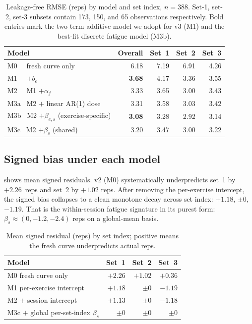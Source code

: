 \documentclass[11pt]{article}
\begin{document}
\begin{table}[ht]
\centering
\caption{Leakage-free RMSE (reps) by model and set index, $n=388$.
Set-1, set-2, set-3 subsets contain 173, 150, and 65 observations respectively.
Bold entries mark the two-term additive model we adopt for v3 (M1) and the best-fit discrete fatigue model (M3b).}
\label{tab:rmse}
\begin{tabular}{lrrrr}
\toprule
\textbf{Model} & \textbf{Overall} & \textbf{Set~1} & \textbf{Set~2} & \textbf{Set~3} \\
\midrule
M0~~ fresh curve only                     & 6.18 & 7.19 & 6.91 & 4.26 \\
M1~~ $+ b_e$                              & \textbf{3.68} & 4.17 & 3.36 & 3.55 \\
M2~~ M1 $+ \alpha_j$                      & 3.33 & 3.65 & 3.00 & 3.43 \\
M3a~ M2 $+$ linear AR(1) dose             & 3.31 & 3.58 & 3.03 & 3.42 \\
M3b~ M2 $+ \beta_{e,s}$ (exercise-specific)& \textbf{3.08} & 3.28 & 2.92 & 3.14 \\
M3c~ M2 $+ \beta_s$ (shared)              & 3.20 & 3.47 & 3.00 & 3.22 \\
\bottomrule
\end{tabular}
\end{table}

\subsection{Signed bias under each model}
 shows mean signed residuals.
v2 (M0) systematically underpredicts set~1 by $+2.26$~reps and set~2 by $+1.02$ reps.
After removing the per-exercise intercept, the signed bias collapses to a clean monotone decay across set index: $+1.18$, $\pm 0$, $-1.19$.
That is the within-session fatigue signature in its purest form: $\beta_s \approx (0, -1.2, -2.4)$ reps on a global-mean basis.

\begin{table}[ht]
\centering
\caption{Mean signed residual (reps) by set index; positive means the fresh curve underpredicts actual reps.}
\label{tab:bias}
\begin{tabular}{lrrr}
\toprule
\textbf{Model} & \textbf{Set~1} & \textbf{Set~2} & \textbf{Set~3} \\
\midrule
M0  fresh curve only                  & $+2.26$ & $+1.02$ & $+0.36$ \\
M1  per-exercise intercept            & $+1.18$ & $\pm 0$ & $-1.19$ \\
M2  $+$ session intercept             & $+1.13$ & $\pm 0$ & $-1.18$ \\
M3c $+$ global per-set-index $\beta_s$& $\pm 0$ & $\pm 0$ & $\pm 0$ \\
\bottomrule
\end{tabular}
\end{table}
\end{document}
